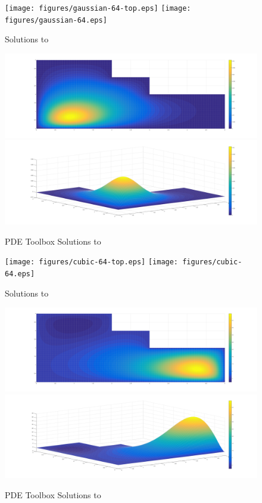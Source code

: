 \documentclass[10pt,a4paper]{article}
\begin{document}
\begin{figure}[H]
\texttt{[image: figures/gaussian-64-top.eps]}
\texttt{[image: figures/gaussian-64.eps]}
\caption{Solutions to }
\label{fig: gaussian solutions}
\end{figure}

\begin{figure}[H]
\includegraphics[width=\linewidth]{figures/gaussian-top-pdetool.png}
\includegraphics[width=\linewidth]{figures/gaussian-iso-pdetool.png}
\caption{PDE Toolbox Solutions to }
\label{fig: pdetool gaussian solutions}
\end{figure}

\begin{figure}[H]
\texttt{[image: figures/cubic-64-top.eps]}
\texttt{[image: figures/cubic-64.eps]}
\caption{Solutions to }
\label{fig: cubic solutions}
\end{figure}

\begin{figure}[H]
\includegraphics[width=\linewidth]{figures/cubic-top-pdetool.png}
\includegraphics[width=\linewidth]{figures/cubic-iso-pdetool.png}
\caption{PDE Toolbox Solutions to }
\label{fig: pdetool cubic solutions}
\end{figure}
\end{document}
